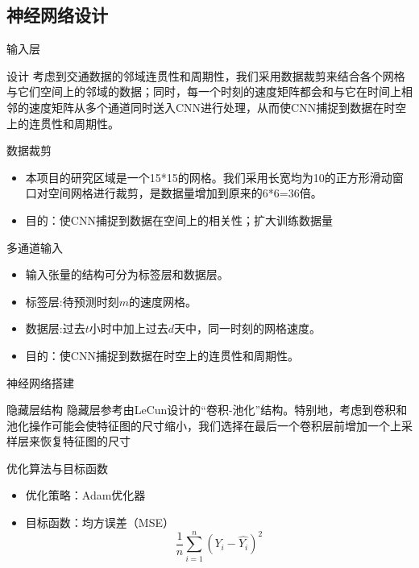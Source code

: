 \documentclass[10pt]{beamer}
\begin{document}
\subsection{神经网络设计}

\begin{frame}{输入层}
    \begin{block}{设计}
       考虑到交通数据的邻域连贯性和周期性，我们采用\alert{数据裁剪}来结合各个网格与它们空间上的邻域的数据；同时，每一个时刻的速度矩阵都会和与它在时间上相邻的速度矩阵从\alert{多个通道}同时送入CNN进行处理，从而使CNN捕捉到数据在时空上的连贯性和周期性。
    \end{block}
    
    \begin{block}{数据裁剪}
        \begin{itemize}
            \item 本项目的研究区域是一个15*15的网格。我们采用长宽均为10的正方形滑动窗口对空间网格进行裁剪，是数据量增加到原来的6*6=36倍。
            \item 目的：使CNN捕捉到数据在\alert{空间上的相关性}；扩大训练数据量
        \end{itemize}
    \end{block}
    
    \begin{block}{多通道输入}
    \begin{itemize}
        \item 输入张量的结构可分为\alert{标签层}和\alert{数据层}。
        \item 标签层:待预测时刻$m$的速度网格。
        \item 数据层:过去$t$小时中加上过去$d$天中，同一时刻的网格速度。
        \item 目的：使CNN捕捉到数据在时空上的\alert{连贯性}和\alert{周期性}。
    \end{itemize}
    \end{block}
\end{frame}



\begin{frame}{神经网络搭建}
    \begin{block}{隐藏层结构}
    隐藏层参考由LeCun设计的\alert{“卷积-池化”结构}。特别地，考虑到卷积和池化操作可能会使特征图的尺寸缩小，我们选择在最后一个卷积层前增加一个\alert{上采样层}来恢复特征图的尺寸
    \end{block}
    
    \begin{block}{优化算法与目标函数}
        \begin{itemize}
            \item 优化策略：Adam优化器
            \item 目标函数：均方误差（MSE）\\
            \begin{equation}
                \frac{1}{n} \sum_{i=1}^{n} \left( Y_i - \hat{Y_i} \right)^2
            \end{equation}
            \end{itemize}
    \end{block} 
\end{frame}
\end{document}
